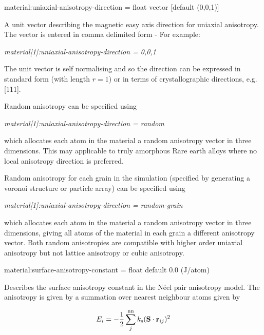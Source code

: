 {\zicf material:uniaxial-anisotropy-direction = float vector [default (0,0,1)]} A unit vector \ei describing the magnetic easy axis direction for uniaxial anisotropy. The vector is entered in comma delimited form - For example:

\textit{material[1]:uniaxial-anisotropy-direction = 0,0,1}

\noindent The unit vector is self normalising and so the direction can be expressed in standard form (with length $r =  1$) or in terms of crystallographic directions, e.g. [111].

\noindent Random anisotropy can be specified using

\textit{material[1]:uniaxial-anisotropy-direction = random}

\noindent which allocates each atom in the material a random anisotropy vector in three dimensions. This may applicable to truly amorphous Rare earth alloys where no local anisotropy direction is preferred.

Random anisotropy for each grain in the simulation (specified by generating a voronoi structure or particle array) can be specified using

\textit{material[1]:uniaxial-anisotropy-direction = random-grain}

which allocates each atom in the material a random anisotropy vector in three dimensions, giving all atoms of the material in each grain a different
anisotropy vector. Both random anisotropies are compatible with higher order uniaxial anisotropy but not lattice anisotropy or cubic anisotropy.



{\zicf material:surface-anisotropy-constant = float default 0.0 (J/atom)} Describes the surface anisotropy constant in the N\'eel pair anisotropy model. The anisotropy is given by a summation over nearest neighbour atoms given by

\begin{equation*}
E_i = -\frac{1}{2} \sum_j^{\mathrm{nn}} k_{\mathrm{s}} (\mathbf{S} \cdot \mathbf{r}_{ij} )^2
\end{equation*}

